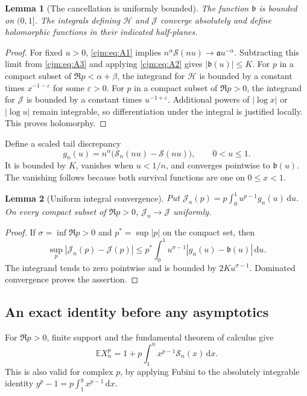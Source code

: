\documentclass[11pt,a4paper]{article}
\newtheorem{lemma}[lemma]{Lemma}
\theoremstyle{definition}\newaliascnt{definition}{theorem}
\theoremstyle{remark}\newaliascnt{remark}{theorem}
\newcommand{\dd}{\mathrm d}
\newcommand{\ljE}{\mathbb E}
\begin{document}
\begin{lemma}[The cancellation is uniformly bounded]
\label{cjm:lem:bounded}
The function $\mathfrak b$ is bounded on $(0,1]$. The integrals defining
$\mathcal H$ and $\mathcal J$ converge absolutely and define holomorphic
functions in their indicated half-planes.
\end{lemma}
\begin{proof}
For fixed $u>0$, \eqref{cjm:eq:A1} implies
$n^\alpha\mathcal S(nu)\to\mathfrak a u^{-\alpha}$. Subtracting this limit
from \eqref{cjm:eq:A3} and applying \eqref{cjm:eq:A2} gives
$|\mathfrak b(u)|\le K$. For $p$ in a compact subset of
$\Re p<\alpha+\beta$, the integrand for $\mathcal H$ is bounded by a
constant times $x^{-1-\varepsilon}$ for some $\varepsilon>0$. For $p$ in a
compact subset of $\Re p>0$, the integrand for $\mathcal J$ is bounded by a
constant times $u^{-1+\varepsilon}$. Additional powers of $|\log x|$ or
$|\log u|$ remain integrable, so differentiation under the integral is
justified locally. This proves holomorphy.
\end{proof}

Define a scaled tail discrepancy
\begin{equation}
 g_n(u)=n^\alpha\bigl(\mathcal S_n(nu)-\mathcal S(nu)\bigr),\qquad 0<u\le1.
 \label{cjm:eq:g}
\end{equation}
It is bounded by $K$, vanishes when $u<1/n$, and converges pointwise to
$\mathfrak b(u)$. The vanishing follows because both survival functions are
one on $0\le x<1$.

\begin{lemma}[Uniform integral convergence]
\label{cjm:lem:Jconv}
Put $\mathcal J_n(p)=p\int_0^1u^{p-1}g_n(u)\,\dd u$. On every compact subset
of $\Re p>0$, $\mathcal J_n\to\mathcal J$ uniformly.
\end{lemma}
\begin{proof}
If $\sigma=\inf\Re p>0$ and $p^\ast=\sup|p|$ on the compact set, then
\[
 \sup_p|\mathcal J_n(p)-\mathcal J(p)|
 \le p^\ast\int_0^1u^{\sigma-1}|g_n(u)-\mathfrak b(u)|\,\dd u.
\]
The integrand tends to zero pointwise and is bounded by
$2K u^{\sigma-1}$. Dominated convergence proves the assertion.
\end{proof}

\subsection{An exact identity before any asymptotics}
For $\Re p>0$, finite support and the fundamental theorem of calculus give
\begin{equation}
 \ljE X_n^p=1+p\int_1^n x^{p-1}\mathcal S_n(x)\,\dd x.
 \label{cjm:eq:tail-moment}
\end{equation}
This is also valid for complex $p$, by applying Fubini to the absolutely
integrable identity $y^p-1=p\int_1^y x^{p-1}\,\dd x$.
\end{document}
